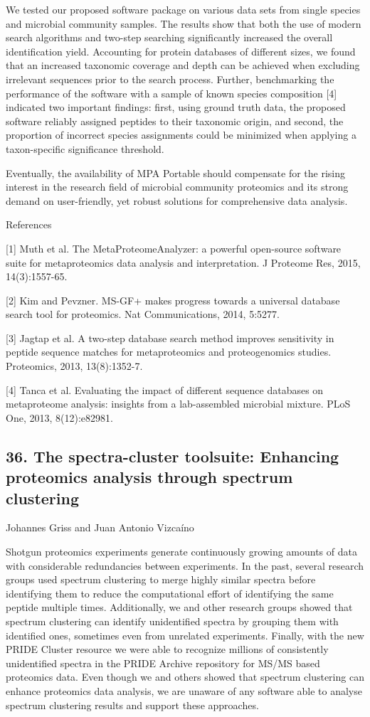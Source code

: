 We tested our proposed software package on various data sets from single species and microbial community samples. The results show that both the use of modern search algorithms and two-step searching significantly increased the overall identification yield. Accounting for protein databases of different sizes, we found that an increased taxonomic coverage and depth can be achieved when excluding irrelevant sequences prior to the search process. Further, benchmarking the performance of the software with a sample of known species composition [4] indicated two important findings: first, using ground truth data, the proposed software reliably assigned peptides to their taxonomic origin, and second, the proportion of incorrect species assignments could be minimized when applying a taxon-specific significance threshold.

Eventually, the availability of MPA Portable should compensate for the rising interest in the research field of microbial community proteomics and its strong demand on user-friendly, yet robust solutions for comprehensive data analysis.

References

[1] Muth et al. The MetaProteomeAnalyzer: a powerful open-source software suite for metaproteomics data analysis and interpretation. J Proteome Res, 2015, 14(3):1557-65.

[2] Kim and Pevzner. MS-GF+ makes progress towards a universal database search tool for proteomics. Nat Communications, 2014, 5:5277.

[3] Jagtap et al. A two-step database search method improves sensitivity in peptide sequence matches for metaproteomics and proteogenomics studies. Proteomics, 2013, 13(8):1352-7.

[4] Tanca et al. Evaluating the impact of different sequence databases on metaproteome analysis: insights from a lab-assembled microbial mixture. PLoS One, 2013, 8(12):e82981.

\subsection*{\color{eubicRed} 36. The spectra-cluster toolsuite: Enhancing proteomics analysis through spectrum clustering}
{\color{eubicGray}Johannes Griss and Juan Antonio Vizcaíno}

Shotgun proteomics experiments generate continuously growing amounts of data with considerable redundancies between experiments. In the past, several research groups used spectrum clustering to merge highly similar spectra before identifying them to reduce the computational effort of identifying the same peptide multiple times. Additionally, we and other research groups showed that spectrum clustering can identify unidentified spectra by grouping them with identified ones, sometimes even from unrelated experiments. Finally, with the new PRIDE Cluster resource we were able to recognize millions of consistently unidentified spectra in the PRIDE Archive repository for MS/MS based proteomics data. Even though we and others showed that spectrum clustering can enhance proteomics data analysis, we are unaware of any software able to analyse spectrum clustering results and support these approaches.

